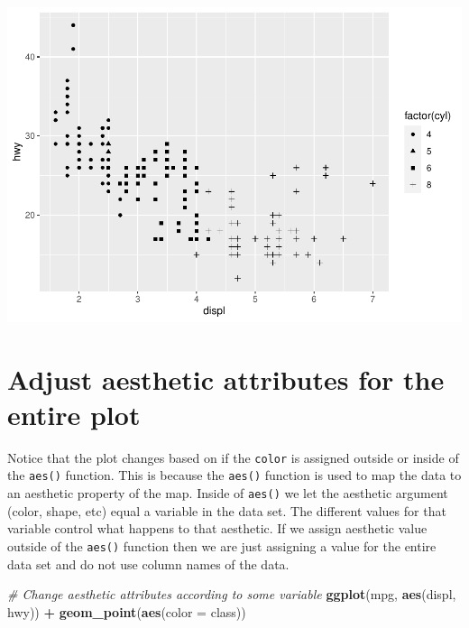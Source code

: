 \documentclass[
]{book}
\newenvironment{Shaded}{\begin{snugshade}}{\end{snugshade}}
\newcommand{\CommentTok}[1]{\textcolor[rgb]{0.56,0.35,0.01}{\textit{#1}}}
\newcommand{\DataTypeTok}[1]{\textcolor[rgb]{0.13,0.29,0.53}{#1}}
\newcommand{\KeywordTok}[1]{\textcolor[rgb]{0.13,0.29,0.53}{\textbf{#1}}}
\newcommand{\NormalTok}[1]{#1}
\newcommand{\OperatorTok}[1]{\textcolor[rgb]{0.81,0.36,0.00}{\textbf{#1}}}
\newcommand{\StringTok}[1]{\textcolor[rgb]{0.31,0.60,0.02}{#1}}
\begin{document}
\includegraphics{_main_files/figure-latex/unnamed-chunk-252-3.pdf}

\hypertarget{adjust-aesthetic-attributes-for-the-entire-plot}{%
\section{Adjust aesthetic attributes for the entire plot}\label{adjust-aesthetic-attributes-for-the-entire-plot}}

Notice that the plot changes based on if the \texttt{color} is assigned outside or inside of the \texttt{aes()} function. This is because the \texttt{aes()} function is used to map the data to an aesthetic property of the map. Inside of \texttt{aes()} we let the aesthetic argument (color, shape, etc) equal a variable in the data set. The different values for that variable control what happens to that aesthetic. If we assign aesthetic value outside of the \texttt{aes()} function then we are just assigning a value for the entire data set and do not use column names of the data.

\begin{Shaded}
\begin{Highlighting}[]
\CommentTok{# Change aesthetic attributes according to some variable}
\KeywordTok{ggplot}\NormalTok{(mpg, }\KeywordTok{aes}\NormalTok{(displ, hwy)) }\OperatorTok{+}\StringTok{ }\KeywordTok{geom_point}\NormalTok{(}\KeywordTok{aes}\NormalTok{(}\DataTypeTok{color =}\NormalTok{ class))}
\end{Highlighting}
\end{Shaded}
\end{document}
